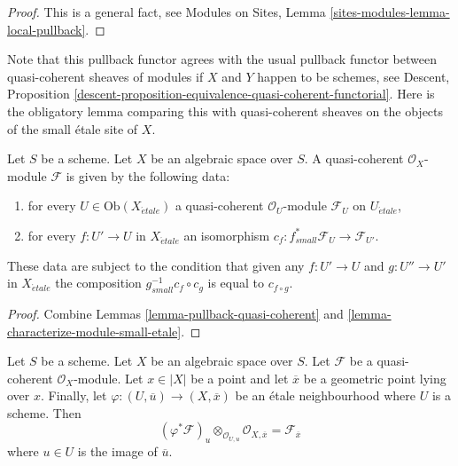 \begin{proof}
This is a general fact, see
Modules on Sites, Lemma \ref{sites-modules-lemma-local-pullback}.
\end{proof}

\noindent
Note that this pullback functor agrees with the usual pullback functor
between quasi-coherent sheaves of modules if $X$ and $Y$ happen to be
schemes, see
Descent, Proposition
\ref{descent-proposition-equivalence-quasi-coherent-functorial}.
Here is the obligatory lemma comparing this with quasi-coherent sheaves
on the objects of the small \'etale site of $X$.

\begin{lemma}
\label{lemma-characterize-quasi-coherent-small-etale}
Let $S$ be a scheme. Let $X$ be an algebraic space over $S$.
A quasi-coherent $\mathcal{O}_X$-module $\mathcal{F}$
is given by the following data:
\begin{enumerate}
\item for every $U \in \text{Ob}(X_{\acute{e}tale})$ a quasi-coherent
$\mathcal{O}_U$-module $\mathcal{F}_U$ on $U_{\acute{e}tale}$,
\item for every $f : U' \to U$ in $X_{\acute{e}tale}$ an isomorphism
$c_f : f_{small}^*\mathcal{F}_U \to \mathcal{F}_{U'}$.
\end{enumerate}
These data are subject to the condition that given any $f : U' \to U$
and $g : U'' \to U'$ in $X_{\acute{e}tale}$ the composition
$g_{small}^{-1}c_f \circ c_g$ is equal to $c_{f \circ g}$.
\end{lemma}

\begin{proof}
Combine Lemmas \ref{lemma-pullback-quasi-coherent} and
\ref{lemma-characterize-module-small-etale}.
\end{proof}

\begin{lemma}
\label{lemma-stalk-quasi-coherent}
Let $S$ be a scheme.
Let $X$ be an algebraic space over $S$.
Let $\mathcal{F}$ be a quasi-coherent $\mathcal{O}_X$-module.
Let $x \in |X|$ be a point and let $\overline{x}$ be a geometric
point lying over $x$. Finally, let
$\varphi : (U, \overline{u}) \to (X, \overline{x})$
be an \'etale neighbourhood where $U$ is a scheme.
Then
$$
(\varphi^*\mathcal{F})_u \otimes_{\mathcal{O}_{U, u}}
\mathcal{O}_{X, \overline{x}} =
\mathcal{F}_{\overline{x}}
$$
where $u \in U$ is the image of $\overline{u}$.
\end{lemma}

